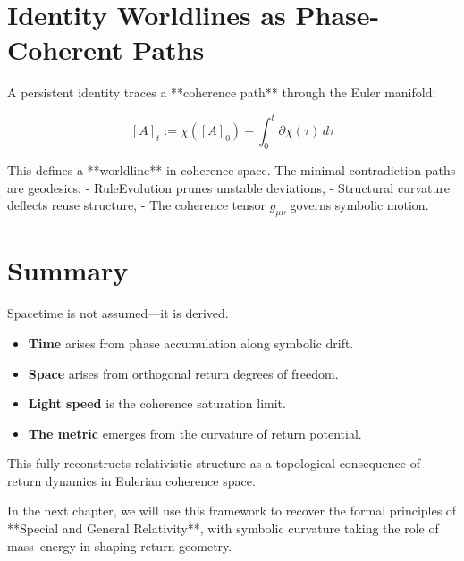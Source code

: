 \section{Identity Worldlines as Phase-Coherent Paths}

A persistent identity traces a **coherence path** through the Euler manifold:

\[
[A]_t := \chi([A]_0) + \int_0^t \partial \chi(\tau)\,d\tau
\]

This defines a **worldline** in coherence space. The minimal contradiction paths are geodesics:
- RuleEvolution prunes unstable deviations,
- Structural curvature deflects reuse structure,
- The coherence tensor $g_{\mu\nu}$ governs symbolic motion.

\section{Summary}

Spacetime is not assumed—it is derived.

\begin{itemize}
  \item \textbf{Time} arises from phase accumulation along symbolic drift.
  \item \textbf{Space} arises from orthogonal return degrees of freedom.
  \item \textbf{Light speed} is the coherence saturation limit.
  \item \textbf{The metric} emerges from the curvature of return potential.
\end{itemize}

This fully reconstructs relativistic structure as a topological consequence of return dynamics in Eulerian coherence space.

In the next chapter, we will use this framework to recover the formal principles of **Special and General Relativity**, with symbolic curvature taking the role of mass–energy in shaping return geometry.
